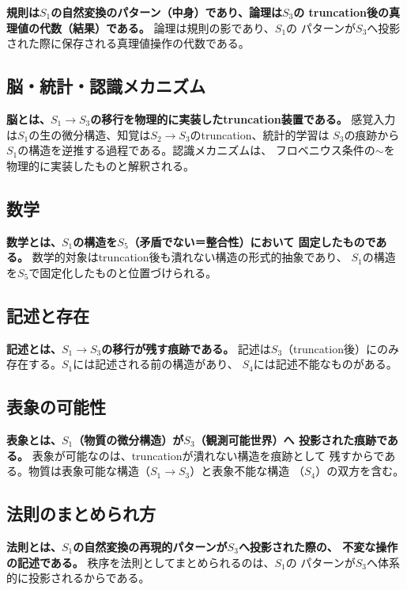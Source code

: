 \documentclass[11pt,a4paper]{ltjsarticle}
\theoremstyle{remark}
\begin{document}
\textbf{規則は$S_1$の自然変換のパターン（中身）であり、論理は$S_3$の
truncation後の真理値の代数（結果）である。} 論理は規則の影であり、$S_1$の
パターンが$S_3$へ投影された際に保存される真理値操作の代数である。

\subsection{脳・統計・認識メカニズム}

\textbf{脳とは、$S_1\to S_3$の移行を物理的に実装したtruncation装置である。}
感覚入力は$S_1$の生の微分構造、知覚は$S_2\to S_3$のtruncation、統計的学習は
$S_3$の痕跡から$S_1$の構造を逆推する過程である。認識メカニズムは、
フロベニウス条件の$\sim$を物理的に実装したものと解釈される。

\subsection{数学}

\textbf{数学とは、$S_1$の構造を$S_5$（矛盾でない＝整合性）において
固定したものである。} 数学的対象はtruncation後も潰れない構造の形式的抽象であり、
$S_1$の構造を$S_5$で固定化したものと位置づけられる。

\subsection{記述と存在}

\textbf{記述とは、$S_1\to S_3$の移行が残す痕跡である。}
記述は$S_3$（truncation後）にのみ存在する。$S_1$には記述される前の構造があり、
$S_4$には記述不能なものがある。

\subsection{表象の可能性}

\textbf{表象とは、$S_1$（物質の微分構造）が$S_3$（観測可能世界）へ
投影された痕跡である。} 表象が可能なのは、truncationが潰れない構造を痕跡として
残すからである。物質は表象可能な構造（$S_1\to S_3$）と表象不能な構造
（$S_4$）の双方を含む。

\subsection{法則のまとめられ方}

\textbf{法則とは、$S_1$の自然変換の再現的パターンが$S_3$へ投影された際の、
不変な操作の記述である。} 秩序を法則としてまとめられるのは、$S_1$の
パターンが$S_3$へ体系的に投影されるからである。
\end{document}
